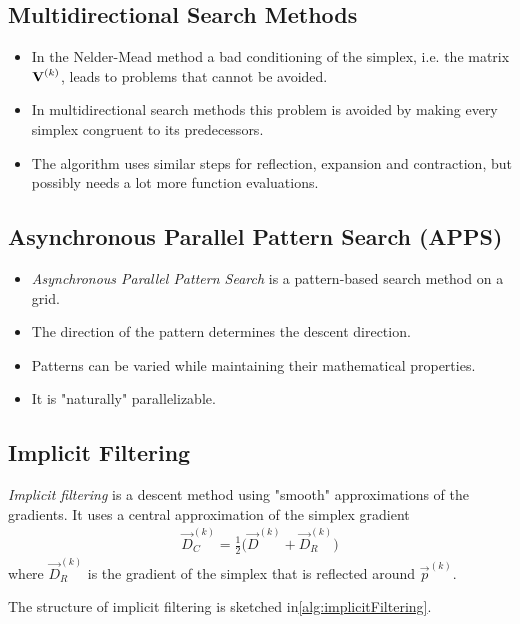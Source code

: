 		\subsection{Multidirectional Search Methods}
			\begin{itemize}
				\item In the Nelder-Mead method a bad conditioning of the simplex, i.e. the matrix \( \boldsymbol{\mathrm{V}}^{(k)} \), leads to problems that cannot be avoided.
				\item In multidirectional search methods this problem is avoided by making every simplex congruent to its predecessors.
				\item The algorithm uses similar steps for reflection, expansion and contraction, but possibly needs a lot more function evaluations.
			\end{itemize}

		\subsection{Asynchronous Parallel Pattern Search (APPS)}
			\begin{itemize}
				\item \emph{Asynchronous Parallel Pattern Search} is a pattern-based search method on a grid.
				\item The direction of the pattern determines the descent direction.
				\item Patterns can be varied while maintaining their mathematical properties.
				\item It is "naturally" parallelizable.
			\end{itemize}

		\subsection{Implicit Filtering}
			\emph{Implicit filtering} is a descent method using "smooth" approximations of the gradients. It uses a central approximation of the simplex gradient
			\begin{align*}
				\vec{D}_C^{(k)} = \frac{1}{2} \big( \vec{D}^{(k)} + \vec{D}_R^{(k)} \big)
			\end{align*}
			where \( \vec{D}_R^{(k)} \) is the gradient of the simplex that is reflected around \( \vec{p}^{(k)} \).
			
			The structure of implicit filtering is sketched in\autoref{alg:implicitFiltering}.
			
